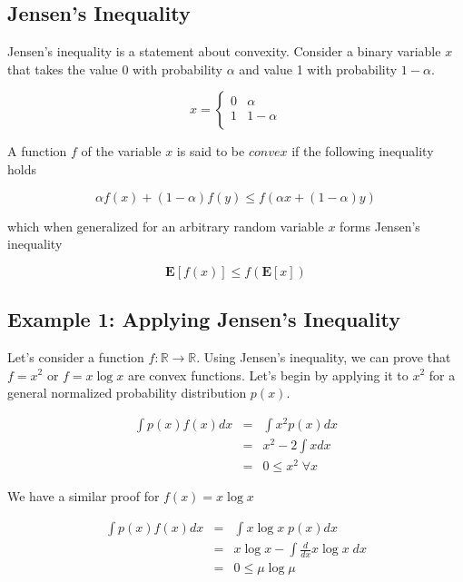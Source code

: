 \documentclass[a4paper,11pt]{book}
\begin{document}
\subsection{Jensen's Inequality}

Jensen's inequality is a statement about convexity. Consider a binary variable $x$ that takes the value 0 with probability $\alpha$ and value 1 with probability $1-\alpha$.

\[x= \begin{cases} 
      0 & \alpha \\
      1 & 1-\alpha \\
   \end{cases}
\]

A function $f$ of the variable $x$ is said to be $\textit{convex}$ if the following inequality holds

\begin{equation*}
\alpha f(x) + (1-\alpha)f(y) \leq f(\alpha x + (1-\alpha)y)
\end{equation*}

which when generalized for an arbitrary random variable $x$ forms Jensen's inequality

\begin{equation}
\mathbf{E}[f(x)] \leq f(\mathbf{E}[x])
\end{equation}


\subsection{Example 1: Applying Jensen's Inequality}

Let's consider a function $f: \mathbb{R} \rightarrow \mathbb{R}$. Using Jensen's inequality, we can prove that $f=x^{2}$ or $f=x\log x$ are convex functions. Let's begin by applying it to $x^{2}$ for a general normalized probability distribution $p(x)$.

\begin{eqnarray*}
\int p(x)f(x)dx & = & \int x^{2}p(x)dx\\
&=& x^{2} - 2\int xdx\\
&=& 0 \leq x^{2} \; \forall x
\end{eqnarray*}

We have a similar proof for $f(x) = x\log x$

\begin{eqnarray*}
\int p(x)f(x)dx & = & \int x\log x\; p(x)dx\\
&=& x\log x - \int \frac{d}{dx}x\log x\;dx\\
&=& 0 \leq \mu \log \mu
\end{eqnarray*}
\end{document}
